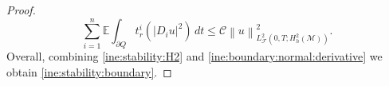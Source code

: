 \documentclass[10pt,a4paper]{amsart}
\newcommand{\E}{\mathbb{E}}
\begin{document}
\begin{proof}
\begin{equation}\label{ine:boundary:normal:derivative}
   \sum_{i=1}^{n}\E\int_{\partial Q}t_{r}^{i}(|D_{i}u|^{2})\,dt\leq 
   \mathcal{C} \left\| u\right\|^{2}_{L_{\mathcal{F}}^{2}(0,T;H_h^{2}(\mathcal{M}))}. 
\end{equation}
Overall, combining \eqref{ine:stability:H2} and \eqref{ine:boundary:normal:derivative} we obtain \eqref{ine:stability:boundary}.
\end{proof}
\end{document}
